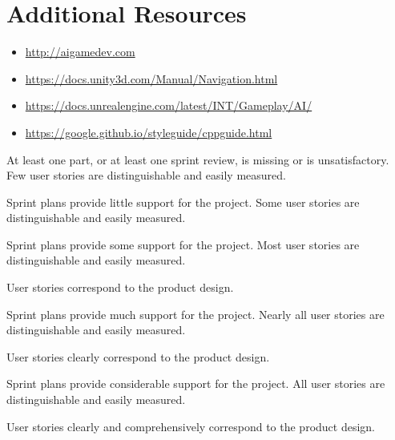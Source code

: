 \documentclass{../../fal_assignment}
\begin{document}
\section*{Additional Resources}

\begin{itemize}
	\item \url{http://aigamedev.com}
    \item \url{https://docs.unity3d.com/Manual/Navigation.html}
    \item \url{https://docs.unrealengine.com/latest/INT/Gameplay/AI/}
    \item \url{https://google.github.io/styleguide/cppguide.html}
\end{itemize}

\rubricyeartwo
\begin{markingrubric}
		\grade\fail At least one part, or at least one sprint review, is missing or is unsatisfactory.
%
        \grade \fail Few user stories are distinguishable and easily measured.
            \par Sprint plans provide little support for the project.
        \grade Some user stories are distinguishable and easily measured.
            \par Sprint plans provide some support for the project.
        \grade Most user stories are distinguishable and easily measured.
            \par User stories correspond to the product design.
            \par Sprint plans provide much support for the project.
        \grade Nearly all user stories are distinguishable and easily measured.
            \par User stories clearly correspond to the product design.
            \par Sprint plans provide considerable support for the project.
        \grade All user stories are distinguishable and easily measured.
            \par User stories clearly and comprehensively correspond to the product design.

\end{markingrubric}
\end{document}

